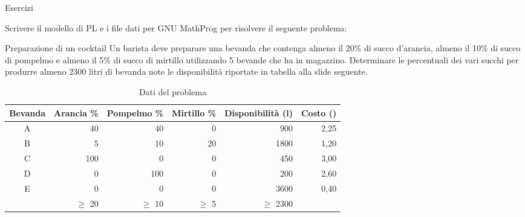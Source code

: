 \documentclass{beamer}
\begin{document}
\generatitolo


\begin{frame}[allowframebreaks]
{Esercizi}

Scrivere il modello di PL e i file dati per GNU MathProg
per risolvere il seguente problema:

\begin{block}{Preparazione di un cocktail}
Un barista deve preparare una bevanda che contenga
almeno il 20\% di succo d'arancia,
almeno il 10\% di succo di pompelmo e
almeno il  5\% di succo di mirtillo
utilizzando 5 bevande che ha in magazzino.
Determinare le percentuali dei vari succhi per produrre
almeno 2300 litri di bevanda note le disponibilit\`a
riportate in tabella alla slide seguente.
\end{block}

\framebreak

\begin{table}
\begin{tabular}{crrrrr}\toprule
{\scriptsize \bf Bevanda} & {\scriptsize \bf Arancia \%} & {\scriptsize \bf Pompelmo \%} & {\scriptsize \bf Mirtillo \%} &{\scriptsize \bf Disponibilit\`a (l)}& {\scriptsize \bf Costo (\EUR{})}\\\midrule
A &  40 &  40 &   0 &  900 & 2,25\\
B &   5 &  10 &  20 & 1800 & 1,20\\
C & 100 &   0 &   0 &  450 & 3,00\\
D &   0 & 100 &   0 &  200 & 2,60\\
E &   0 &   0 &   0 & 3600 & 0,40\\\midrule
  &$\ge$ 20&$\ge$ 10&$\ge$  5&$\ge$ 2300\\\bottomrule
\end{tabular}
\caption{Dati del problema}
\end{table}
\end{frame}
\end{document}
